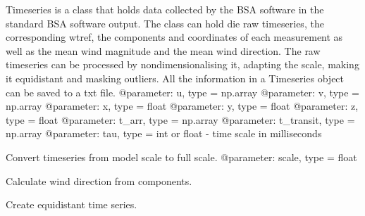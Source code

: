 \documentclass[letterpaper,10pt,english]{sphinxmanual}
\begin{document}

\begin{fulllineitems}
\label{\detokenize{index:windtunnel.Timeseries}}
Timeseries is a class that holds data collected by the BSA software in
the standard BSA software output. The class can hold die raw timeseries,
the corresponding wtref, the components and coordinates of each
measurement as well as the mean wind magnitude and the mean wind direction.
The raw timeseries can be processed by nondimensionalising it, adapting the
scale, making it equidistant and masking outliers. All the information in
a Timeseries object can be saved to a txt file.
@parameter: u, type = np.array
@parameter: v, type = np.array
@parameter: x, type = float
@parameter: y, type = float
@parameter: z, type = float
@parameter: t\_arr, type = np.array
@parameter: t\_transit, type = np.array
@parameter: tau, type = int or float - time scale in milliseconds

\begin{fulllineitems}
\label{\detokenize{index:windtunnel.Timeseries.adapt_scale}}
Convert timeseries from model scale to full scale.
@parameter: scale, type = float

\end{fulllineitems}


\begin{fulllineitems}
\label{\detokenize{index:windtunnel.Timeseries.calc_direction}}
Calculate wind direction from components.

\end{fulllineitems}


\begin{fulllineitems}
\label{\detokenize{index:windtunnel.Timeseries.calc_equidistant_timesteps}}
Create equidistant time series.


\end{fulllineitems}
\end{fulllineitems}
\end{document}
